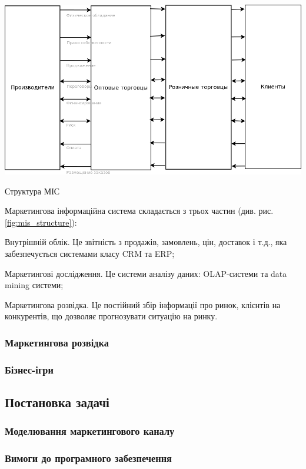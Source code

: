 \begin{stdfigure}
\includegraphics[width=6in]{images/mis_structure.png}
\caption{Структура МІС}
\label{fig:mis_structure}
\end{stdfigure}
 
Маркетингова інформаційна система складається з трьох частин (див. рис. \ref{fig:mis_structure}): 
\begin{longEnumerate}
\item Внутрішній облік. Це звітність з продажів, замовлень, цін, доставок і т.д., яка забезпечується системами класу CRM та ERP;
\item Маркетингові дослідження. Це системи аналізу даних: OLAP-системи та data mining системи;
\item Маркетингова розвідка. Це постійний збір інформації про ринок, клієнтів на конкурентів, що дозволяє прогнозувати ситуацію на ринку.
\end{longEnumerate}

\subsubsection{Маркетингова розвідка}

\subsubsection{Бізнес-ігри}

\subsection{Постановка задачі}
\subsubsection{Моделювання маркетингового каналу}

\subsubsection{Вимоги до програмного забезпечення}